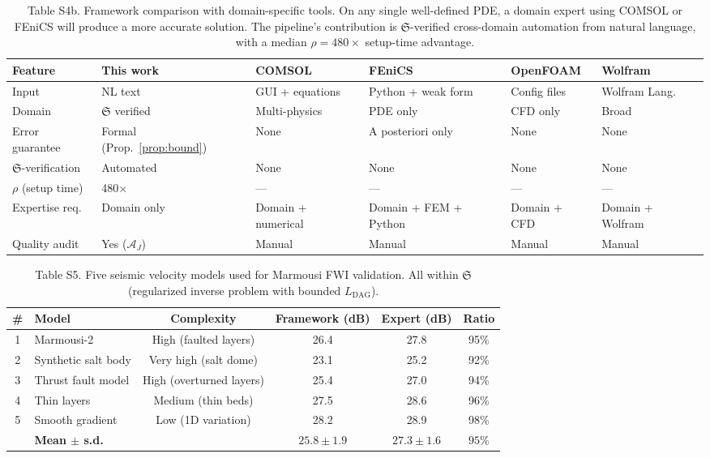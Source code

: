 \documentclass[11pt,a4paper]{article}
\newcommand{\Sclass}{\mathfrak{S}}
\newcommand{\Agent}{\mathcal{A}}
\begin{document}
\begin{table}[htbp]
\centering
\caption{Table S4b. Framework comparison with domain-specific tools. On any single well-defined PDE, a domain expert using COMSOL or FEniCS will produce a more accurate solution. The pipeline's contribution is $\Sclass$-verified cross-domain automation from natural language, with a median $\rho = 480\times$ setup-time advantage.}
\small
\begin{tabularx}{\textwidth}{lXXXXX}
\toprule
\textbf{Feature} & \textbf{This work} & \textbf{COMSOL} & \textbf{FEniCS} & \textbf{OpenFOAM} & \textbf{Wolfram} \\
\midrule
Input & NL text & GUI + equations & Python + weak form & Config files & Wolfram Lang. \\
Domain & $\Sclass$ verified & Multi-physics & PDE only & CFD only & Broad \\
Error guarantee & Formal (Prop.~\ref{prop:bound}) & None & A posteriori only & None & None \\
$\Sclass$-verification & Automated & None & None & None & None \\
$\rho$ (setup time) & 480$\times$ & --- & --- & --- & --- \\
Expertise req. & Domain only & Domain + numerical & Domain + FEM + Python & Domain + CFD & Domain + Wolfram \\
Quality audit & Yes ($\Agent_J$) & Manual & Manual & Manual & Manual \\
\bottomrule
\end{tabularx}
\end{table}

\begin{table}[htbp]
\centering
\caption{Table S5. Five seismic velocity models used for Marmousi FWI validation. All within $\Sclass$ (regularized inverse problem with bounded $L_{\text{DAG}}$).}
\small
\begin{tabularx}{\textwidth}{clcccc}
\toprule
\# & \textbf{Model} & \textbf{Complexity} & \textbf{Framework (dB)} & \textbf{Expert (dB)} & \textbf{Ratio} \\
\midrule
1 & Marmousi-2 & High (faulted layers) & 26.4 & 27.8 & 95\% \\
2 & Synthetic salt body & Very high (salt dome) & 23.1 & 25.2 & 92\% \\
3 & Thrust fault model & High (overturned layers) & 25.4 & 27.0 & 94\% \\
4 & Thin layers & Medium (thin beds) & 27.5 & 28.6 & 96\% \\
5 & Smooth gradient & Low (1D variation) & 28.2 & 28.9 & 98\% \\
\midrule
& \textbf{Mean $\pm$ s.d.} & & $25.8 \pm 1.9$ & $27.3 \pm 1.6$ & $95\%$ \\
\bottomrule
\end{tabularx}
\end{table}
\end{document}
